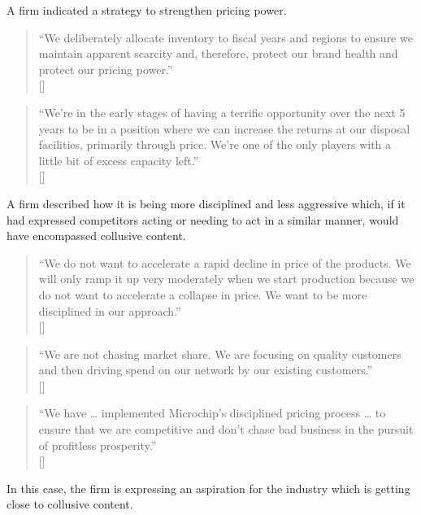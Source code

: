 A firm indicated a strategy to strengthen pricing power.

\begin{quote}
``We deliberately allocate inventory to fiscal years and regions to ensure we maintain apparent scarcity and, therefore, protect our brand health and protect our pricing power.'' \\
\mbox{[]}
\end{quote}

\begin{quote}
``We're in the early stages of having a terrific opportunity over the next 5 years to be in a position where we can increase the returns at our disposal facilities, primarily through price. We’re one of the only players with a little bit of excess capacity left.'' \\
\mbox{[]}
\end{quote}

A firm described how it is being more disciplined and less aggressive which, if it had expressed competitors acting or needing to act in a similar manner, would have encompassed collusive content.

\begin{quote}
``We do not want to accelerate a rapid decline in price of the products. We will only ramp it up very moderately when we start production because we do not want to accelerate a collapse in price. We want to be more disciplined in our approach.'' \\
\mbox{[]}
\end{quote}

\begin{quote}
``We are not chasing market share. We are focusing on quality customers and then driving spend on our network by our existing customers.'' \\
\mbox{[]}
\end{quote}

\begin{quote}
``We have … implemented Microchip's disciplined pricing process … to ensure that we are competitive and don't chase bad business in the pursuit of profitless prosperity.'' \\
\mbox{[]}
\end{quote}

In this case, the firm is expressing an aspiration for the industry which is getting close to collusive content.


